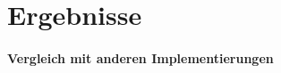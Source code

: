 \section{Ergebnisse}
\label{ergebnisse}

\paragraph{Vergleich mit anderen Implementierungen}
\label{vergleich_ergebnisse}
